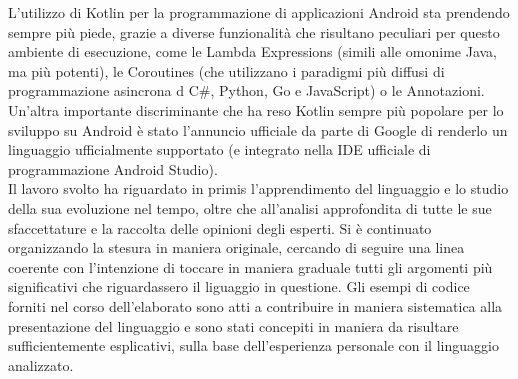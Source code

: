 L'utilizzo di Kotlin per la programmazione di applicazioni Android sta prendendo sempre più piede, grazie a diverse funzionalità che risultano peculiari per questo ambiente di esecuzione, come le Lambda Expressions (simili alle omonime Java, ma più potenti), le Coroutines (che utilizzano i paradigmi più diffusi di programmazione asincrona d C\#, Python, Go e JavaScript) o le Annotazioni. Un'altra importante discriminante che ha reso Kotlin sempre più popolare per lo sviluppo su Android è stato l'annuncio ufficiale da parte di Google di renderlo un linguaggio ufficialmente supportato (e integrato nella IDE ufficiale di programmazione Android Studio).\\

Il lavoro svolto ha riguardato in primis l'apprendimento del linguaggio e lo studio della sua evoluzione nel tempo, oltre che all'analisi approfondita di tutte le sue sfaccettature e la raccolta delle opinioni degli esperti. Si è continuato organizzando la stesura in maniera originale, cercando di seguire una linea coerente con l'intenzione di toccare in maniera graduale tutti gli argomenti più significativi che riguardassero il liguaggio in questione. Gli esempi di codice forniti nel corso dell'elaborato sono atti a contribuire in maniera sistematica alla presentazione del linguaggio e sono stati concepiti in maniera da risultare sufficientemente esplicativi, sulla base dell'esperienza personale con il linguaggio analizzato.\\
